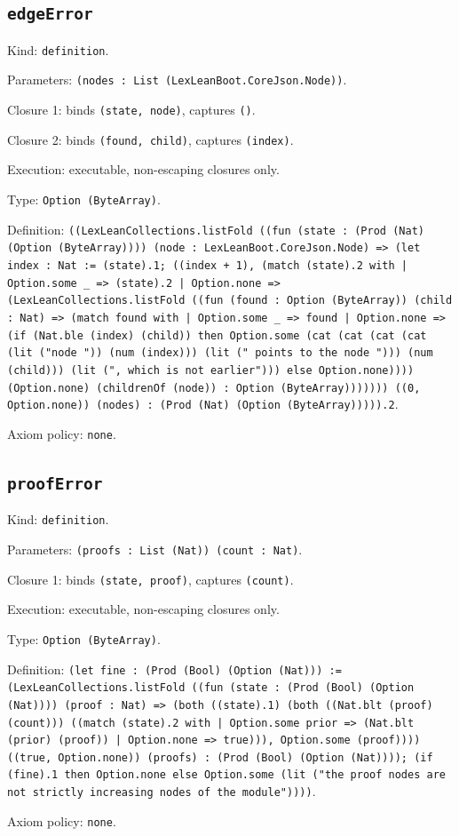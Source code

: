 \documentclass[11pt]{article}
\begin{document}
\subsection*{\texttt{edgeError}}
\noindent Kind: \texttt{definition}.\par
\noindent Parameters: \texttt{(nodes : List (LexLeanBoot.CoreJson.Node))}.\par
\noindent Closure 1: binds \texttt{(state, node)}, captures \texttt{()}.\par
\noindent Closure 2: binds \texttt{(found, child)}, captures \texttt{(index)}.\par
\noindent Execution: executable, non-escaping closures only.\par
\noindent Type: \texttt{Option (ByteArray)}.\par
\noindent Definition: \texttt{((LexLeanCollections.listFold ((fun (state : (Prod (Nat) (Option (ByteArray)))) (node : LexLeanBoot.CoreJson.Node) => (let index : Nat := (state).1; ((index + 1), (match (state).2 with | Option.some \_ => (state).2 | Option.none => (LexLeanCollections.listFold ((fun (found : Option (ByteArray)) (child : Nat) => (match found with | Option.some \_ => found | Option.none => (if (Nat.ble (index) (child)) then Option.some (cat (cat (cat (cat (lit ("node ")) (num (index))) (lit (" points to the node "))) (num (child))) (lit (", which is not earlier"))) else Option.none)))) (Option.none) (childrenOf (node)) : Option (ByteArray))))))) ((0, Option.none)) (nodes) : (Prod (Nat) (Option (ByteArray))))).2}.\par
\noindent Axiom policy: \texttt{none}.\par
\subsection*{\texttt{proofError}}
\noindent Kind: \texttt{definition}.\par
\noindent Parameters: \texttt{(proofs : List (Nat)) (count : Nat)}.\par
\noindent Closure 1: binds \texttt{(state, proof)}, captures \texttt{(count)}.\par
\noindent Execution: executable, non-escaping closures only.\par
\noindent Type: \texttt{Option (ByteArray)}.\par
\noindent Definition: \texttt{(let fine : (Prod (Bool) (Option (Nat))) := (LexLeanCollections.listFold ((fun (state : (Prod (Bool) (Option (Nat)))) (proof : Nat) => (both ((state).1) (both ((Nat.blt (proof) (count))) ((match (state).2 with | Option.some prior => (Nat.blt (prior) (proof)) | Option.none => true))), Option.some (proof)))) ((true, Option.none)) (proofs) : (Prod (Bool) (Option (Nat)))); (if (fine).1 then Option.none else Option.some (lit ("the proof nodes are not strictly increasing nodes of the module"))))}.\par
\noindent Axiom policy: \texttt{none}.\par
\end{document}
